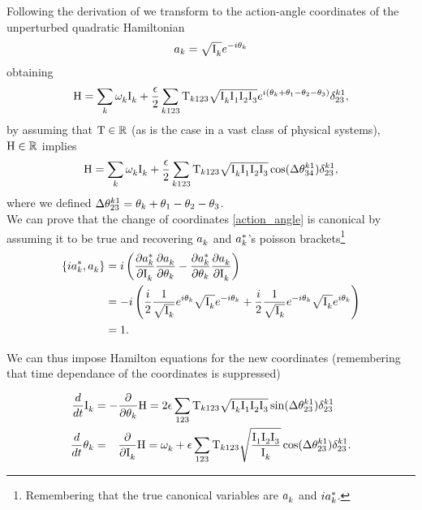 Following the derivation of \cite{Onorato2020} we transform to the action-angle coordinates of the unperturbed quadratic Hamiltonian
\begin{equation}
    a_k = \sqrt{\mathrm{I}^{}_k}e^{-i\theta_k}
    \label{action_angle}
\end{equation} 
obtaining 
\begin{equation}
    \mathrm{H} = \sum_k \omega^{}_k \mathrm{I}^{}_k + \frac{\epsilon}{2} \sum_{k123}\mathrm{T}_{k123}\sqrt{\mathrm{I}^{}_k\mathrm{I}^{}_1\mathrm{I}^{}_2\mathrm{I}^{}_3}e^{i(\theta_k + \theta_1 - \theta_2 - \theta_3)}\delta^{k1}_{23},
\end{equation}
by assuming that $\mathrm{T} \in \mathbb{R}$ (as is the case in a vast class of physical systems), $\mathrm{H} \in \mathbb{R}$ implies 
\begin{equation}
    \mathrm{H} = \sum_k \omega^{}_k \mathrm{I}^{}_k + \frac{\epsilon}{2} \sum_{k123}\mathrm{T}_{k123}\sqrt{\mathrm{I}^{}_k\mathrm{I}^{}_1\mathrm{I}^{}_2\mathrm{I}^{}_3}\cos(\Delta\theta^{k1}_{34})\delta^{k1}_{23},
\end{equation}
where we defined $\Delta\theta^{k1}_{23}=\theta_k + \theta_1 - \theta_2 - \theta_3$. \\
We can prove that the change of coordinates \eqref{action_angle} is canonical by assuming it to be true and recovering $a_k^{}$ and $a_k^{*}$'s poisson 
brackets\footnote{Remembering that the true canonical variables are $a_k^{}$ and $ia_k^{*}$.} 
\begin{align}
    \left\{ ia_k^{*}, a_k^{} \right\} &= i \left( \frac{\partial a_k^{*}}{\partial \mathrm{I}^{}_k}\frac{\partial a_k^{}}{\partial \theta_k}  -
    \frac{\partial a_k^{*}}{\partial \theta_k}\frac{\partial a_k^{}}{\partial \mathrm{I}^{}_k}  \right) \\
    &= - i \left( \frac{i}{2} \frac{1}{\sqrt{\mathrm{I}^{}_k}}e^{i\theta_k}\sqrt{\mathrm{I}^{}_k}e^{-i\theta_k} + 
    \frac{i}{2} \frac{1}{\sqrt{\mathrm{I}^{}_k}}e^{-i\theta_k}\sqrt{\mathrm{I}^{}_k}e^{i\theta_k}\right) \\
    &= 1 .
\end{align} 

We can thus impose Hamilton equations for the new coordinates (remembering that time dependance of the coordinates is suppressed)

\begin{align}
    \frac{d}{dt}\mathrm{I}^{}_k &= - \frac{\partial }{\partial \theta_k}\mathrm{H} = 2 \epsilon \sum_{123} \mathrm{T}_{k123} \sqrt{\mathrm{I}^{}_k\mathrm{I}^{}_1\mathrm{I}^{}_2\mathrm{I}^{}_3} \sin(\Delta\theta^{k1}_{23})\delta^{k1}_{23}
    \label{Hameq1}\\
    \frac{d}{dt}\theta_k &= \phantom{-} \frac{\partial }{\partial \mathrm{I}^{}_k}\mathrm{H} = \omega^{}_k + 
    \epsilon \sum_{123} \mathrm{T}_{k123} \sqrt{\frac{\mathrm{I}^{}_1\mathrm{I}^{}_2\mathrm{I}^{}_3}{\mathrm{I}^{}_k}}\cos(\Delta\theta^{k1}_{23})\delta^{k1}_{23}.
    \label{Hameq2}
\end{align}


